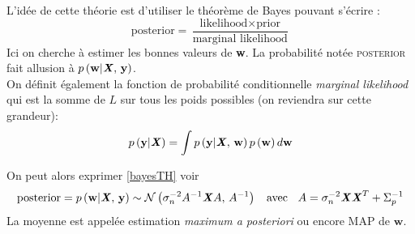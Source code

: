 \documentclass[a4paper,12pt]{report}
\newcommand{\bepar}[1]{
	\left( #1 \right)  
}
\numberwithin{equation}{section} %
\begin{document}
L'idée de cette théorie est d'utiliser le théorème de Bayes pouvant s'écrire :
\begin{equation}
\text{posterior} = \frac{\text{likelihood}\times\text{prior}}{\text{marginal likelihood}} \label{bayesTH}
\end{equation}
Ici on cherche à estimer les bonnes valeurs de \textbf{w}. La probabilité notée \textsc{posterior} fait allusion à $p\bepar{\textbf{w}|\textbf{\textit{X}}, \, \textbf{y}}$. \\
On définit également la fonction de probabilité conditionnelle \textit{marginal likelihood} qui est la somme de $L$ sur tous les poids possibles (on reviendra sur cette grandeur):
\begin{equation}
p\bepar{\textbf{y}|\textbf{\textit{X}}} = \int p\bepar{\textbf{y} | \textbf{\textit{X}},\, \textbf{w}} p\left( \textbf{w}\right ) d\textbf{w} 
\end{equation}

\noindent On peut alors exprimer \eqref{bayesTH} voir \citep{rasmussen2006gaussian}
\begin{equation}
\text{posterior} = p\bepar{\textbf{w}|\textbf{\textit{X}}, \, \textbf{y}} \sim \mathcal{N}\bepar{\sigma_n^{-2} A^{-1}\textbf{\textit{X}} A, \, A^{-1}} \text{\hspace{2mm} avec \hspace{2mm}} A = \sigma_n ^{-2} \textbf{\textit{X}}\textbf{\textit{X}}^T + \Sigma_p^{-1} \label{pwxy}
\end{equation}
La moyenne est appelée estimation \textit{maximum a posteriori} ou encore MAP de $\textbf{w}$. 
\end{document}
